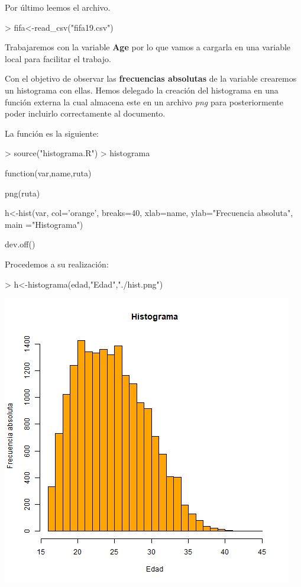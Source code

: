 \documentclass [a4paper] {article}
\begin{document}
\bigskip
Por \'ultimo leemos el archivo.
\begin{Schunk}
\begin{Sinput}
> fifa<-read_csv("fifa19.csv")
\end{Sinput}
\end{Schunk}

\bigskip
Trabajaremos con la variable \textbf{Age} por lo que vamos a cargarla en una variable
local para facilitar el trabajo.
\begin{Schunk}
\end{Schunk}

\bigskip
Con el objetivo de observar las \textbf{frecuencias absolutas} de la variable crearemos un histograma con ellas. Hemos delegado
la creaci\'on del histograma en una funci\'on externa la cual almacena este en un archivo \textit{png} para posteriormente poder incluirlo
correctamente al documento.

La funci\'on es la siguiente:
\begin{Schunk}
\begin{Sinput}
> source("histograma.R")
> histograma
\end{Sinput}
\begin{Soutput}
function(var,name,ruta) {
    png(ruta)
 
    h<-hist(var, col='orange', breaks=40, xlab=name, 
            ylab="Frecuencia absoluta", main ="Histograma") 

    dev.off()
}
\end{Soutput}
\end{Schunk}

Procedemos a su realizaci\'on:
\begin{Schunk}
\begin{Sinput}
> h<-histograma(edad,"Edad","./hist.png")
\end{Sinput}
\end{Schunk}
\includegraphics[width=\textwidth]{hist}
\end{document}
